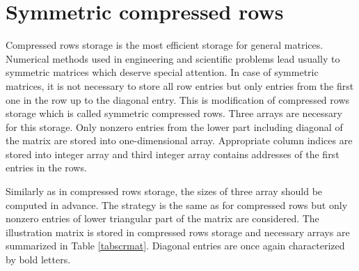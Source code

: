 \section{Symmetric compressed rows}
\label{sectscrstor}

Compressed rows storage is the most efficient storage for general matrices. Numerical methods used
in engineering and scientific problems lead usually to symmetric matrices which deserve special attention.
In case of symmetric matrices, it is not necessary to store all row entries but only entries from the first
one in the row up to the diagonal entry. This is modification of compressed rows storage which is called
symmetric compressed rows. Three arrays are necessary for this storage. Only nonzero entries from the
lower part including diagonal of the matrix are stored into one-dimensional array. Appropriate column indices
are stored into integer array and third integer array contains addresses of the first entries in the rows.

Similarly as in compressed rows storage, the sizes of three array should be computed in advance.
The strategy is the same as for compressed rows but only nonzero entries of lower triangular part of the matrix
are considered. The illustration matrix is stored in compressed rows storage and necessary arrays are
summarized in Table \ref{tabscrmat}. Diagonal entries are once again characterized by bold letters.


